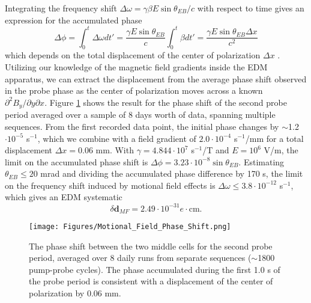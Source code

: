 \documentclass [10pt, twoside] {uwthesis}[2012/04/02]
\begin{document}
Integrating the frequency shift $\Delta\omega = \gamma \beta E \sin\theta_{EB}/c$ with respect to time gives an expression for the accumulated phase 
\begin{equation}
\Delta \phi = \int^t_0 \Delta\omega dt' = \dfrac{\gamma E \sin\theta_{EB}}{c} \int^t_0 \beta dt' =  \dfrac{\gamma E \sin\theta_{EB}\Delta x}{c^2}
\end{equation}
which depends on the total displacement of the center of polarization $\Delta x$ \cite{2013_Hg_EDM_PRA}. Utilizing our knowledge of the magnetic field gradients inside the EDM apparatus, we can extract the displacement from the average phase shift observed in the probe phase as the center of polarization moves across a known $\partial^2 B_y/\partial y \partial x.$ Figure \ref{MotionalFieldShift} shows the result for the phase shift of the second probe period averaged over a sample of 8 days worth of data, spanning multiple sequences. From the first recorded data point, the initial phase changes by $\sim$1.2$\cdot 10^{-5}$ s$^{-1}$, which we combine with a field gradient of $2.0 \cdot 10^{-4}$ s$^{-1}$/mm for a total displacement $\Delta x = 0.06$ mm. With $\gamma = 4.844 \cdot 10^7$ s$^{-1}$/T and $E = 10^6$ V/m, the limit on the accumulated phase shift is $\Delta \phi = 3.23 \cdot 10^{-8} \sin\theta_{EB}.$ Estimating $\theta_{EB} \leq 20$ mrad and dividing the accumulated phase difference by 170 s, the limit on the frequency shift induced by motional field effects is $\Delta \omega \leq 3.8 \cdot 10^{-12}$ s$^{-1}$, which gives an EDM systematic 
\begin{equation}
\delta\mathbf{d}_{MF} = 2.49 \cdot 10^{-31} e\cdot \text{cm}.
\end{equation}

\begin{figure}
\begin{center}
\texttt{[image: Figures/Motional\_Field\_Phase\_Shift.png]}
\end{center}
\caption[Average Phase Shift $\Delta\phi_{MT_MB}(t)$]%
{\narrower The phase shift between the two middle cells for the second probe period, averaged over 8 daily runs from separate sequences ($\sim$1800 pump-probe cycles). The phase accumulated during the first 1.0 s of the probe period is consistent with a displacement of the center of polarization by 0.06 mm.}
\label{MotionalFieldShift}
\end{figure}	
\end{document}
